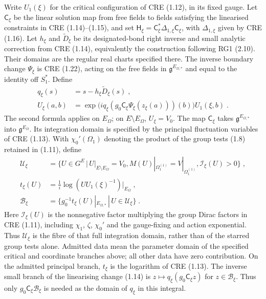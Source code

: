 \documentclass[11pt]{article}
\begin{document}
Write $U_1(\xi)$ for the critical configuration of CRE (1.12), in its fixed gauge. Let $\mathsf C_\xi$ be the linear solution map from free fields to fields satisfying the linearised constraints in CRE (1.14)--(1.15), and set $\mathsf H_\xi=\mathsf C_\xi^*\Delta_{1,\xi}\mathsf C_\xi$, with $\Delta_{1,\xi}$ given by CRE (1.16). Let $h_\xi$ and $\widetilde D_\xi$ be its designated-bond right inverse and small analytic correction from CRE (1.14), equivalently the construction following RG1 (2.10). Their domains are the regular real charts specified there. The inverse boundary change $\Psi_\xi$ is CRE (1.22), acting on the free fields in $\mathfrak g^{E_{\Omega,*}}$ and equal to the identity off $S_1^*$. Define
\begin{equation}\label{eq:retained-reconstruction}
    \begin{aligned}
        q_\xi(s)&=s-h_\xi\widetilde D_\xi(s)\;,\\
        U_\xi(a,b)&=
            \exp\bigl(iq_\xi(g_0\mathsf C_\xi\Psi_\xi(z_\xi(a)))(b)\bigr)
                U_1(\xi,b)\;.
    \end{aligned}
\end{equation}
The second formula applies on $E_\Omega$; on $E\setminus E_\Omega$, $U_\xi=V_0$. The map $\mathsf C_\xi$ takes $\mathfrak g^{E_{\Omega,*}}$ into $\mathfrak g^{E_\Omega}$. Its integration domain is specified by the principal fluctuation variables of CRE (1.13). With $\chi_0'(\Omega_1)$ denoting the product of the group tests (1.8) retained in (1.11), define
\begin{equation}\label{eq:retained-source-domain}
    \begin{aligned}
        \mathcal U_\xi&=\bigl\{U\in G^E\, | \,
            U|_{E\setminus E_\Omega}=V_0,
            M(U)|_{\Omega_1^{(1)}}=V|_{\Omega_1^{(1)}},
            \mathcal I_\xi(U)>0\bigr\}\;,\\
        t_\xi(U)&=\frac{1}{i}\log(UU_1(\xi)^{-1})|_{E_\Omega}\;,\\
        \mathcal B_\xi&=\bigl\{g_0^{-1}t_\xi(U)|_{E_{\Omega,*}}
            \, | \,U\in\mathcal U_\xi\bigr\}\;.
    \end{aligned}
\end{equation}
Here $\mathcal I_\xi(U)$ is the nonnegative factor multiplying the group Dirac factors in CRE (1.11), including $\chi_1$, $\zeta$, $\chi_0'$ and the gauge-fixing and action exponential. Thus $\mathcal U_\xi$ is the fibre of that full integration domain, rather than of the starred group tests alone. Admitted data mean the parameter domain of the specified critical and coordinate branches above; all other data have zero contribution. On the admitted principal branch, $t_\xi$ is the logarithm of CRE (1.13). The inverse small branch of the linearising change (1.14) is $z\mapsto q_\xi(g_0\mathsf C_\xi z)$ for $z\in\mathcal B_\xi$. Thus only $g_0\mathsf C_\xi\mathcal B_\xi$ is needed as the domain of $q_\xi$ in this integral.
\end{document}
